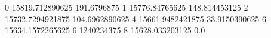 0 15819.712890625 191.6796875
1 15776.84765625 148.814453125
2 15732.7294921875 104.6962890625
4 15661.9482421875 33.9150390625
6 15634.1572265625 6.1240234375
8 15628.033203125 0.0
